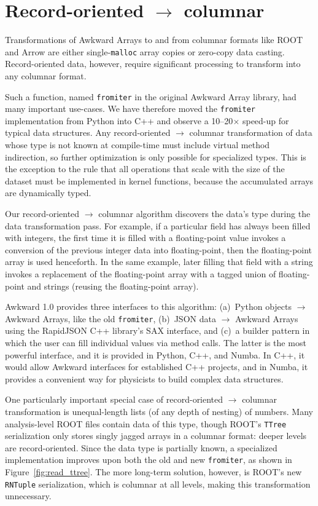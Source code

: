 \documentclass{webofc}
\begin{document}
\section{Record-oriented $\to$ columnar}
\label{lab:fillablearray}

Transformations of Awkward Arrays to and from columnar formats like ROOT and Arrow are either single-\texttt{malloc} array copies or zero-copy data casting. Record-oriented data, however, require significant processing to transform into any columnar format.

Such a function, named \texttt{fromiter} in the original Awkward Array library, had many important use-cases. We have therefore moved the \texttt{fromiter} implementation from Python into C++ and observe a 10--20$\times$ speed-up for typical data structures. Any record-oriented $\to$ columnar transformation of data whose type is not known at compile-time must include virtual method indirection, so further optimization is only possible for specialized types. This is the exception to the rule that all operations that scale with the size of the dataset must be implemented in kernel functions, because the accumulated arrays are dynamically typed.

Our record-oriented $\to$ columnar algorithm discovers the data's type during the data transformation pass. For example, if a particular field has always been filled with integers, the first time it is filled with a floating-point value invokes a conversion of the previous integer data into floating-point, then the floating-point array is used henceforth. In the same example, later filling that field with a string invokes a replacement of the floating-point array with a tagged union of floating-point and strings (reusing the floating-point array).

Awkward 1.0 provides three interfaces to this algorithm: (a)~Python objects $\to$ Awkward Arrays, like the old \texttt{fromiter}, (b)~JSON data $\to$ Awkward Arrays using the RapidJSON C++ library's SAX interface, and (c)~a builder pattern in which the user can fill individual values via method calls. The latter is the most powerful interface, and it is provided in Python, C++, and Numba. In C++, it would allow Awkward interfaces for established C++ projects, and in Numba, it provides a convenient way for physicists to build complex data structures.

One particularly important special case of record-oriented $\to$ columnar transformation is unequal-length lists (of any depth of nesting) of numbers. Many analysis-level ROOT files contain data of this type, though ROOT's \texttt{TTree} serialization only stores singly jagged arrays in a columnar format: deeper levels are record-oriented. Since the data type is partially known, a specialized implementation improves upon both the old and new \texttt{fromiter}, as shown in Figure~\ref{fig:read_ttree}. The more long-term solution, however, is ROOT's new \texttt{RNTuple} serialization, which is columnar at all levels, making this transformation unnecessary.
\end{document}
